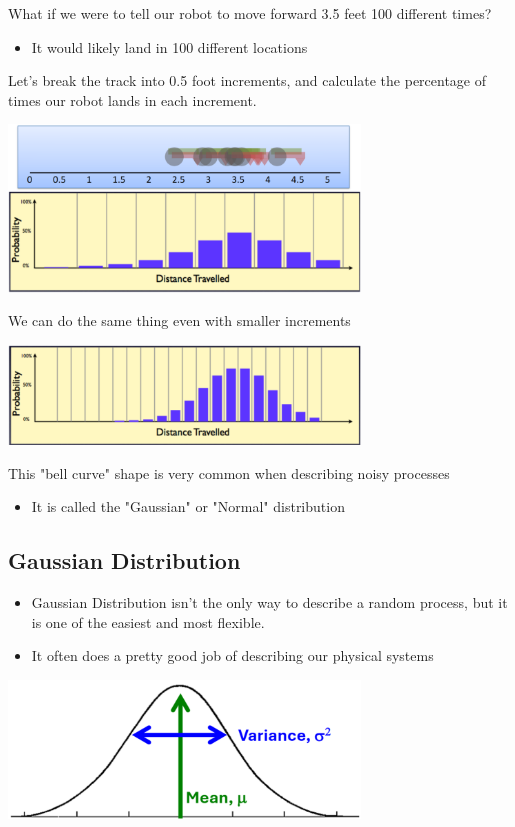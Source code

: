 \documentclass[10pt]{article}
\begin{document}
What if we were to tell our robot to move forward 3.5 feet 100 different times?
\begin{itemize}
	\item It would likely land in 100 different locations
\end{itemize}
Let's break the track into 0.5 foot increments, and calculate the percentage of times our robot lands in each increment.
\begin{center} 
	\includegraphics*[width=0.7\textwidth]{L1_4.png} 
\end{center}
We can do the same thing even with smaller increments
\begin{center} 
	\includegraphics*[width=0.7\textwidth]{L1_5.png} 
\end{center}
This "bell curve" shape is very common when describing noisy processes
\begin{itemize}
	\item It is called the "Gaussian" or "Normal" distribution
\end{itemize}

\subsection*{Gaussian Distribution}
\begin{itemize}
	\item Gaussian Distribution isn't the only way to describe a random process, but it is one of the easiest and most flexible.
	\item It often does a pretty good job of describing our physical systems
\end{itemize}

\begin{center} 
	\includegraphics*[width=0.7\textwidth]{L1_6.png} 
\end{center}
\end{document}
